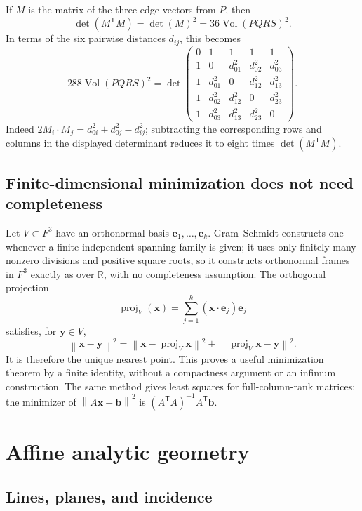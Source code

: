 \documentclass[11pt,letterpaper]{article}
\numberwithin{equation}{section}
\theoremstyle{definition}
\theoremstyle{remark}
\newcommand{\R}{\mathbb R}
\newcommand{\vol}{\operatorname{Vol}}
\newcommand{\norm}[1]{\left\lVert#1\right\rVert}
\newcommand{\vv}[1]{\bm{#1}}
\newcommand{\transpose}{^{\mathsf T}}
\begin{document}
If $M$ is the matrix of the three edge vectors from $P$, then
\[
 \det(M\transpose M)=\det(M)^2=36\vol(PQRS)^2.
\]
In terms of the six pairwise distances $d_{ij}$, this becomes
\begin{equation}\label{e3:eq:cayleymenger}
 288\vol(PQRS)^2=
 \det\begin{pmatrix}
 0&1&1&1&1\\
 1&0&d_{01}^2&d_{02}^2&d_{03}^2\\
 1&d_{01}^2&0&d_{12}^2&d_{13}^2\\
 1&d_{02}^2&d_{12}^2&0&d_{23}^2\\
 1&d_{03}^2&d_{13}^2&d_{23}^2&0
 \end{pmatrix}.
\end{equation}
Indeed $2M_i\cdot M_j=d_{0i}^2+d_{0j}^2-d_{ij}^2$;
subtracting the corresponding rows and columns in the displayed determinant
reduces it to eight times $\det(M\transpose M)$.

\subsection{Finite-dimensional minimization does not need completeness}

Let $V\subset F^3$ have an orthonormal basis $\vv e_1,\ldots,\vv e_k$.
Gram--Schmidt constructs one whenever a finite independent spanning family
is given; it uses only finitely many nonzero divisions and positive square
roots, so it constructs orthonormal frames in $F^3$ exactly as over $\R$, with
no completeness assumption. The orthogonal projection
\[
 \operatorname{proj}_V(\vv x)=\sum_{j=1}^k(\vv x\cdot\vv e_j)\vv e_j
\]
satisfies, for $\vv y\in V$,
\[
 \norm{\vv x-\vv y}^2=
 \norm{\vv x-\operatorname{proj}_V\vv x}^2+
 \norm{\operatorname{proj}_V\vv x-\vv y}^2.
\]
It is therefore the unique nearest point. This proves a useful minimization
theorem by a finite identity, without a compactness argument or an infimum
construction. The same method gives least squares for full-column-rank
matrices: the minimizer of $\norm{A\vv x-\vv b}^2$ is
$(A\transpose A)^{-1}A\transpose\vv b$.

\section{Affine analytic geometry}\label{e3:sec:affine}

\subsection{Lines, planes, and incidence}
\end{document}
